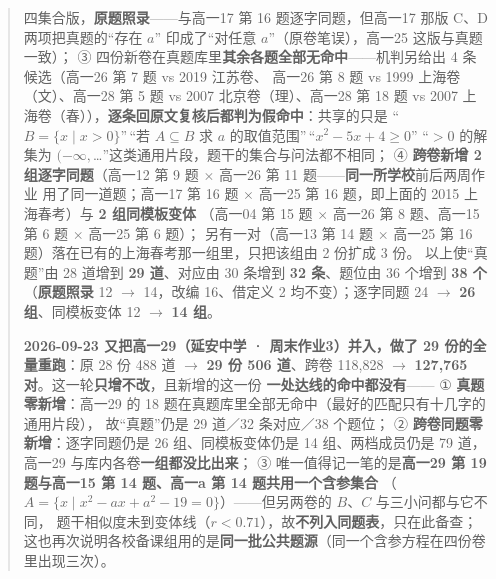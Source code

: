 \documentclass[a4paper,11pt]{article}
\begin{document}
\begin{quote}
四集合版，\textbf{原题照录}------与高一17 第 16 题逐字同题，但高一17 那版 C、D 两项把真题的``存在 \(a\)''
印成了``对任意 \(a\)''（原卷笔误），高一25 这版与真题一致）；
③ 四份新卷在真题库里\textbf{其余各题全部无命中}------机判另给出 4 条候选（高一26 第 7 题 vs 2019 江苏卷、
高一26 第 8 题 vs 1999 上海卷（文）、高一28 第 5 题 vs 2007 北京卷（理）、高一28 第 18 题 vs
2007 上海卷（春）），\textbf{逐条回原文复核后都判为假命中}：共享的只是
``\(B=\{x\mid x>0\}\)''\,``若 \(A\subseteq B\) 求 \(a\) 的取值范围''\,``\(x^2-5x+4\geqslant0\)''
``\(>0\) 的解集为 \((-\infty,\)\ldots''这类通用片段，题干的集合与问法都不相同；
④ \textbf{跨卷新增 2 组逐字同题}（高一12 第 9 题 $\times$ 高一26 第 11 题------\textbf{同一所学校}前后两周作业
用了同一道题；高一17 第 16 题 $\times$ 高一25 第 16 题，即上面的 2015 上海春考）与 \textbf{2 组同模板变体}
（高一04 第 15 题 $\times$ 高一26 第 8 题、高一15 第 6 题 $\times$ 高一25 第 6 题）；
另有一对（高一13 第 14 题 $\times$ 高一25 第 16 题）落在已有的上海春考那一组里，只把该组由 2 份扩成 3 份。
以上使``真题''由 28 道增到 \textbf{29 道}、对应由 30 条增到 \textbf{32 条}、题位由 36 个增到 \textbf{38 个}
（\textbf{原题照录} 12 $\to$ 14，改编 16、借定义 2 均不变）；逐字同题 24 $\to$ \textbf{26 组}、同模板变体 12 $\to$ \textbf{14 组}。

\textbf{2026-09-23 又把高一29（延安中学 · 周末作业3）并入，做了 29 份的全量重跑}：原 28 份 488 道 $\to$
\textbf{29 份 506 道}、跨卷 118,828 $\to$ \textbf{127,765 对}。这一轮\textbf{只增不改}，且新增的这一份
\textbf{一处达线的命中都没有}------
① \textbf{真题零新增}：高一29 的 18 题在真题库里全部无命中（最好的匹配只有十几字的通用片段），
故``真题''仍是 29 道／32 条对应／38 个题位；
② \textbf{跨卷同题零新增}：逐字同题仍是 26 组、同模板变体仍是 14 组、两档成员仍是 79 道，
高一29 与库内各卷\textbf{一组都没比出来}；
③ 唯一值得记一笔的是\textbf{高一29 第 19 题与高一15 第 14 题、高一a 第 14 题共用一个含参集合}
（\(A=\{x\mid x^2-ax+a^2-19=0\}\)）------但另两卷的 \(B\)、\(C\) 与三小问都与它不同，
题干相似度未到变体线（\(r<0.71\)），故\textbf{不列入同题表}，只在此备查；
这也再次说明各校备课组用的是\textbf{同一批公共题源}（同一个含参方程在四份卷里出现三次）。
\end{quote}
\end{document}
